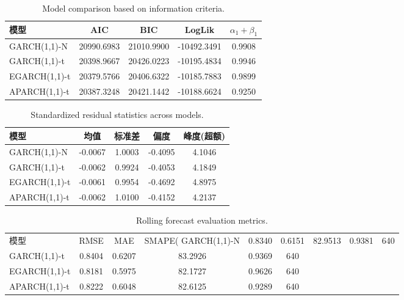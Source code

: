 \begin{table}[htbp]
  \centering
  \caption{Model comparison based on information criteria.}
  \label{tab:model_comp}
  \begin{tabular}{lcccc}
    \toprule
    模型 & AIC & BIC & LogLik & $\alpha_1+\beta_1$ \\
    \midrule
    GARCH(1,1)-N & 20990.6983 & 21010.9900 & -10492.3491 & 0.9908 \\
    GARCH(1,1)-t & 20398.9667 & 20426.0223 & -10195.4834 & 0.9946 \\
    EGARCH(1,1)-t & 20379.5766 & 20406.6322 & -10185.7883 & 0.9899 \\
    APARCH(1,1)-t & 20387.3248 & 20421.1442 & -10188.6624 & 0.9250 \\
    \bottomrule
  \end{tabular}
\end{table}

\begin{table}[htbp]
  \centering
  \caption{Standardized residual statistics across models.}
  \label{tab:std_resid}
  \begin{tabular}{lcccc}
    \toprule
    模型 & 均值 & 标准差 & 偏度 & 峰度(超额) \\
    \midrule
    GARCH(1,1)-N & -0.0067 & 1.0003 & -0.4095 & 4.1046 \\
    GARCH(1,1)-t & -0.0062 & 0.9924 & -0.4053 & 4.1849 \\
    EGARCH(1,1)-t & -0.0061 & 0.9954 & -0.4692 & 4.8975 \\
    APARCH(1,1)-t & -0.0062 & 1.0100 & -0.4152 & 4.2137 \\
    \bottomrule
  \end{tabular}
\end{table}

\begin{table}[htbp]
  \centering
  \caption{Rolling forecast evaluation metrics.}
  \label{tab:forecast_eval}
  \begin{tabular}{lccccc}
    \toprule
    模型 & RMSE & MAE & SMAPE(%
    \midrule
    GARCH(1,1)-N & 0.8340 & 0.6151 & 82.9513 & 0.9381 & 640 \\
    GARCH(1,1)-t & 0.8404 & 0.6207 & 83.2926 & 0.9369 & 640 \\
    EGARCH(1,1)-t & 0.8181 & 0.5975 & 82.1727 & 0.9626 & 640 \\
    APARCH(1,1)-t & 0.8222 & 0.6048 & 82.6125 & 0.9289 & 640 \\
    \bottomrule
  \end{tabular}
\end{table}

